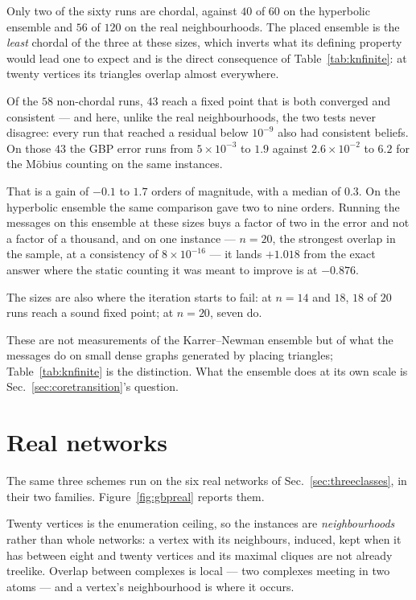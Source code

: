Only two of the sixty runs are chordal, against $40$ of $60$ on the hyperbolic
ensemble and $56$ of $120$ on the real neighbourhoods. The placed ensemble is
the \emph{least} chordal of the three at these sizes, which inverts what its
defining property would lead one to expect and is the direct consequence of
Table~\ref{tab:knfinite}: at twenty vertices its triangles overlap almost
everywhere.

Of the $58$ non-chordal runs, $43$ reach a fixed point that is both converged
and consistent --- and here, unlike the real neighbourhoods, the two tests never
disagree: every run that reached a residual below $10^{-9}$ also had consistent
beliefs. On those $43$ the GBP error runs from $5\times10^{-3}$ to $1.9$ against
$2.6\times10^{-2}$ to $6.2$ for the M\"obius counting on the same instances.

That is a gain of $-0.1$ to $1.7$ orders of magnitude, with a median of $0.3$.
On the hyperbolic ensemble the same comparison gave two to nine orders. Running
the messages on this ensemble at these sizes buys a factor of two in the error
and not a factor of a thousand, and on one instance --- $n=20$, the strongest
overlap in the sample, at a consistency of $8\times10^{-16}$ --- it lands
$+1.018$ from the exact answer where the static counting it was meant to improve
is at $-0.876$.

The sizes are also where the iteration starts to fail: at $n=14$ and $18$,
$18$ of $20$ runs reach a sound fixed point; at $n=20$, seven do.

These are not measurements of the Karrer--Newman ensemble but of what the
messages do on small dense graphs generated by placing triangles;
Table~\ref{tab:knfinite} is the distinction. What the ensemble does at its own
scale is Sec.~\ref{sec:coretransition}'s question.

\section{Real networks}
\label{sec:realoverlap}

The same three schemes run on the six real networks of
Sec.~\ref{sec:threeclasses}, in their two families.
Figure~\ref{fig:gbpreal} reports them.

Twenty vertices is the enumeration ceiling, so the instances are
\emph{neighbourhoods} rather than whole networks: a vertex with its neighbours,
induced, kept when it has between eight and twenty vertices and its maximal
cliques are not already treelike. Overlap between complexes is local --- two
complexes meeting in two atoms --- and a vertex's neighbourhood is where it
occurs.

